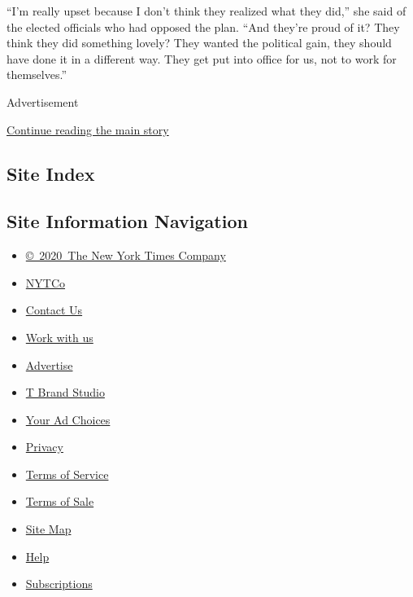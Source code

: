 ``I'm really upset because I don't think they realized what they did,''
she said of the elected officials who had opposed the plan. ``And
they're proud of it? They think they did something lovely? They wanted
the political gain, they should have done it in a different way. They
get put into office for us, not to work for themselves.''

Advertisement

\protect\hyperlink{after-bottom}{Continue reading the main story}

\hypertarget{site-index}{%
\subsection{Site Index}\label{site-index}}

\hypertarget{site-information-navigation}{%
\subsection{Site Information
Navigation}\label{site-information-navigation}}

\begin{itemize}
\tightlist
\item
  \href{https://help.nytimes.com/hc/en-us/articles/115014792127-Copyright-notice}{©~2020~The
  New York Times Company}
\end{itemize}

\begin{itemize}
\tightlist
\item
  \href{https://www.nytco.com/}{NYTCo}
\item
  \href{https://help.nytimes.com/hc/en-us/articles/115015385887-Contact-Us}{Contact
  Us}
\item
  \href{https://www.nytco.com/careers/}{Work with us}
\item
  \href{https://nytmediakit.com/}{Advertise}
\item
  \href{http://www.tbrandstudio.com/}{T Brand Studio}
\item
  \href{https://www.nytimes.com/privacy/cookie-policy\#how-do-i-manage-trackers}{Your
  Ad Choices}
\item
  \href{https://www.nytimes.com/privacy}{Privacy}
\item
  \href{https://help.nytimes.com/hc/en-us/articles/115014893428-Terms-of-service}{Terms
  of Service}
\item
  \href{https://help.nytimes.com/hc/en-us/articles/115014893968-Terms-of-sale}{Terms
  of Sale}
\item
  \href{https://spiderbites.nytimes.com}{Site Map}
\item
  \href{https://help.nytimes.com/hc/en-us}{Help}
\item
  \href{https://www.nytimes.com/subscription?campaignId=37WXW}{Subscriptions}
\end{itemize}
